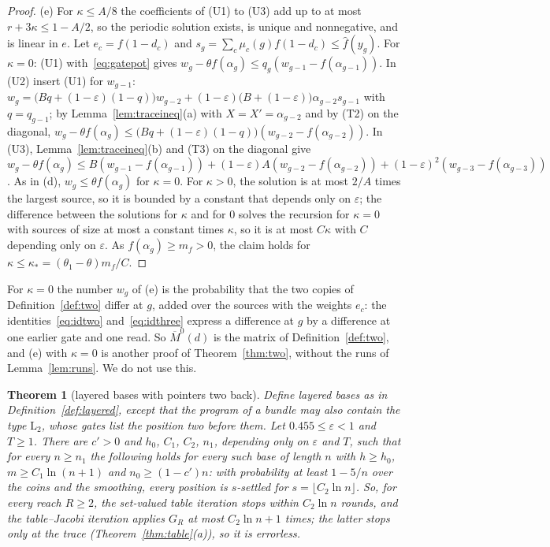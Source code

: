 \documentclass[11pt]{amsart}
\newtheorem{theorem}{Theorem}
\theoremstyle{definition}
\theoremstyle{remark}
\newcommand{\eps}{\varepsilon}
\begin{document}
\begin{proof}
(e) For $\kappa\le A/8$ the coefficients of (U1) to (U3) add up to at most
$r+3\kappa\le1-A/2$, so the periodic solution exists, is unique and nonnegative, and is linear
in $e$. Let $e_c=f(1-d_c)$ and $s_g=\sum_c\mu_c(g)f(1-d_c)\le\hat f(y_g)$. For $\kappa=0$:
(U1) with~\eqref{eq:gatepot} gives $w_g-\theta f(\alpha_g)\le q_g(w_{g-1}-f(\alpha_{g-1}))$. In
(U2) insert (U1) for $w_{g-1}$:
$w_g=\bigl(Bq+(1-\eps)(1-q)\bigr)w_{g-2}+(1-\eps)\bigl(B+(1-\eps)\bigr)\alpha_{g-2}s_{g-1}$ with
$q=q_{g-1}$; by Lemma~\ref{lem:traceineq}(a) with $X=X'=\alpha_{g-2}$ and by (T2) on the
diagonal, $w_g-\theta f(\alpha_g)\le\bigl(Bq+(1-\eps)(1-q)\bigr)(w_{g-2}-f(\alpha_{g-2}))$. In
(U3), Lemma~\ref{lem:traceineq}(b) and (T3) on the diagonal give
$w_g-\theta f(\alpha_g)\le B(w_{g-1}-f(\alpha_{g-1}))+(1-\eps)A(w_{g-2}-f(\alpha_{g-2}))
+(1-\eps)^2(w_{g-3}-f(\alpha_{g-3}))$. As in (d), $w_g\le\theta f(\alpha_g)$ for $\kappa=0$. For
$\kappa>0$, the solution is at most $2/A$ times the largest source, so it is bounded by a
constant that depends only on $\eps$; the difference between the solutions for $\kappa$ and for
$0$ solves the recursion for $\kappa=0$ with sources of size at most a constant times $\kappa$,
so it is at most $C\kappa$ with $C$ depending only on $\eps$. As $f(\alpha_g)\ge m_f>0$, the
claim holds for $\kappa\le\kappa_*=(\theta_1-\theta)m_f/C$.
\end{proof}

\noindent For $\kappa=0$ the number $w_g$ of (e) is the probability that the two copies of
Definition~\ref{def:two} differ at $g$, added over the sources with the weights $e_c$: the
identities~\eqref{eq:idtwo} and~\eqref{eq:idthree} express a difference at $g$ by a difference
at one earlier gate and one read. So $\overline M^0(d)$ is the matrix of
Definition~\ref{def:two}, and (e) with $\kappa=0$ is another proof of Theorem~\ref{thm:two},
without the runs of Lemma~\ref{lem:runs}. We do not use this.

\begin{theorem}[layered bases with pointers two back]\label{thm:twolayered}
Define layered bases as in Definition~\ref{def:layered}, except that the program of a bundle
may also contain the type $\mathrm L_2$, whose gates list the position two before them. Let
$0.455\le\eps<1$ and $T\ge1$. There are $c'>0$ and $h_0$, $C_1$, $C_2$, $n_1$, depending only on
$\eps$ and $T$, such that for every $n\ge n_1$ the following holds for every such base of length
$n$ with $h\ge h_0$, $m\ge C_1\ln(n+1)$ and $n_0\ge(1-c')n$: with probability at least $1-5/n$
over the coins and the smoothing, every position is $s$-settled for $s=\lfloor C_2\ln n\rfloor$.
So, for every reach $R\ge2$, the set-valued table iteration stops within $C_2\ln n$ rounds, and
the table--Jacobi iteration applies $G_R$ at most $C_2\ln n+1$ times; the latter stops only at
the trace (Theorem~\ref{thm:table}(a)), so it is errorless.
\end{theorem}
\end{document}
